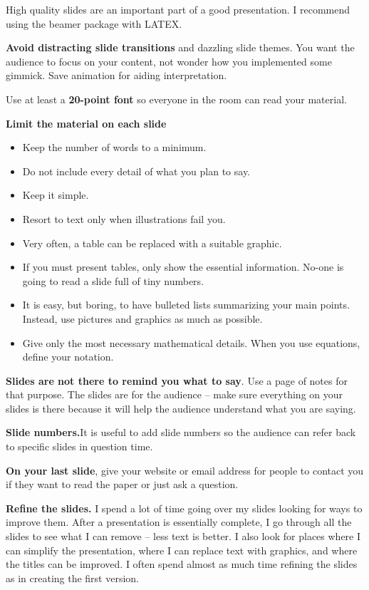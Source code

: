 \documentclass[]{book}
\providecommand{\tightlist}{%
  \setlength{\itemsep}{0pt}\setlength{\parskip}{0pt}}
\theoremstyle{definition}
\theoremstyle{definition}
\theoremstyle{definition}
\theoremstyle{remark}
\begin{document}
High quality slides are an important part of a good
presentation. I recommend using the beamer package
with LATEX.

\textbf{Avoid distracting slide transitions} and dazzling
slide themes. You want the audience to focus on your
content, not wonder how you implemented some
gimmick. Save animation for aiding interpretation.

Use at least a \textbf{20-point font} so everyone in the
room can read your material.

\textbf{Limit the material on each slide}

\begin{itemize}
\tightlist
\item
  Keep the number of words to a minimum.
\item
  Do not include every detail of what you plan to say.
\item
  Keep it simple.
\item
  Resort to text only when illustrations fail you.
\item
  Very often, a table can be replaced with a suitable
  graphic.
\item
  If you must present tables, only show the essential
  information. No-one is going to read a slide full
  of tiny numbers.
\item
  It is easy, but boring, to have bulleted lists summarizing
  your main points. Instead, use pictures and
  graphics as much as possible.
\item
  Give only the most necessary mathematical details.
  When you use equations, define your notation.
\end{itemize}

\textbf{Slides are not there to remind you what to say}.
Use a page of notes for that purpose. The slides are
for the audience -- make sure everything on your
slides is there because it will help the audience understand
what you are saying.

\textbf{Slide numbers.}It is useful to add slide numbers so the audience
can refer back to specific slides in question time.

\textbf{On your last slide}, give your website or email address
for people to contact you if they want to read
the paper or just ask a
question.

\textbf{Refine the slides.} I spend a lot of time going over my slides looking
for ways to improve them. After a presentation is essentially
complete, I go through all the slides to see
what I can remove -- less text is better. I also look for
places where I can simplify the presentation, where
I can replace text with graphics, and where the titles
can be improved. I often spend almost as much time
refining the slides as in creating the first version.
\end{document}
